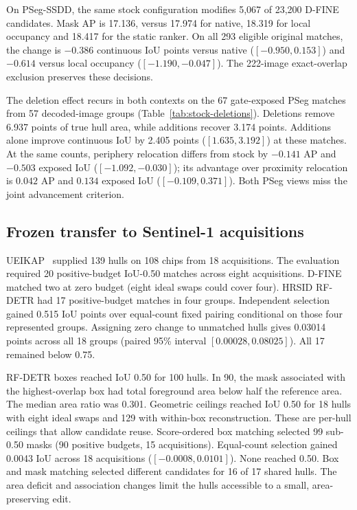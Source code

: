 \documentclass[journal]{IEEEtran}
\begin{document}
On PSeg-SSDD, the same stock configuration modifies 5,067 of 23,200 D-FINE candidates. Mask AP is 17.136, versus 17.974 for native, 18.319 for local occupancy and 18.417 for the static ranker. On all 293 eligible original matches, the change is \(-0.386\) continuous IoU points versus native (\([-0.950,0.153]\)) and \(-0.614\) versus local occupancy (\([-1.190,-0.047]\)). The 222-image exact-overlap exclusion preserves these decisions.

The deletion effect recurs in both contexts on the 67 gate-exposed PSeg matches from 57 decoded-image groups (Table~\ref{tab:stock-deletions}). Deletions remove 6.937 points of true hull area, while additions recover 3.174 points. Additions alone improve continuous IoU by 2.405 points (\([1.635,3.192]\)) at these matches. At the same counts, periphery relocation differs from stock by \(-0.141\) AP and \(-0.503\) exposed IoU (\([-1.092,-0.030]\)); its advantage over proximity relocation is \(0.042\) AP and \(0.134\) exposed IoU (\([-0.109,0.371]\)). Both PSeg views miss the joint advancement criterion.

\subsection{Frozen transfer to Sentinel-1 acquisitions}
UEIKAP~\cite{ueikap} supplied 139 hulls on 108 chips from 18 acquisitions. The evaluation required 20 positive-budget IoU-0.50 matches across eight acquisitions. D-FINE matched two at zero budget (eight ideal swaps could cover four). HRSID RF-DETR had 17 positive-budget matches in four groups. Independent selection gained 0.515 IoU points over equal-count fixed pairing conditional on those four represented groups. Assigning zero change to unmatched hulls gives 0.03014 points across all 18 groups (paired 95\% interval \([0.00028,0.08025]\)). All 17 remained below 0.75.

RF-DETR boxes reached IoU 0.50 for 100 hulls. In 90, the mask associated with the highest-overlap box had total foreground area below half the reference area. The median area ratio was 0.301. Geometric ceilings reached IoU 0.50 for 18 hulls with eight ideal swaps and 129 with within-box reconstruction. These are per-hull ceilings that allow candidate reuse. Score-ordered box matching selected 99 sub-0.50 masks (90 positive budgets, 15 acquisitions). Equal-count selection gained 0.0043 IoU across 18 acquisitions (\([-0.0008,0.0101]\)). None reached 0.50. Box and mask matching selected different candidates for 16 of 17 shared hulls. The area deficit and association changes limit the hulls accessible to a small, area-preserving edit.
\end{document}
